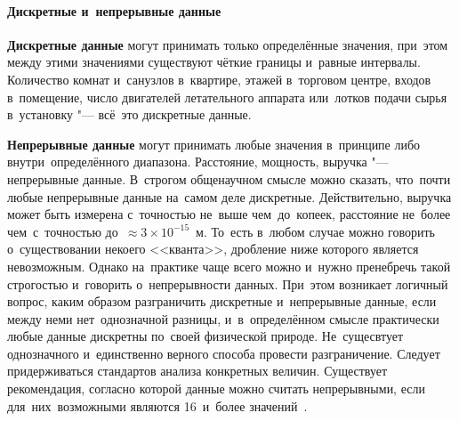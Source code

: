 \documentclass[]{scrartcl}
\begin{document}
\paragraph{Дискретные и~непрерывные данные}\label{Discret-data}
\par
\textbf{Дискретные данные} могут принимать только определённые значения, при~этом между этими значениями существуют чёткие границы и~равные интервалы. Количество комнат и~санузлов в~квартире, этажей в~торговом центре, входов в~помещение, число двигателей летательного аппарата или~лотков подачи сырья в~установку "--- всё~это дискретные данные.
\par
\textbf{Непрерывные данные} могут принимать любые значения в~принципе либо внутри~определённого диапазона. Расстояние, мощность, выручка "--- непрерывные данные. В~строгом общенаучном смысле можно сказать, что~почти любые непрерывные данные на~самом деле дискретные. Действительно, выручка может быть измерена с~точностью не~выше чем~до~копеек, расстояние не~более чем~с~точностью до~$\approx3\times10^{-15}$~м. То~есть в~любом случае можно говорить о~существовании некоего <<кванта>>, дробление ниже которого является невозможным. Однако на~практике чаще всего можно и~нужно пренебречь такой строгостью и~говорить о~непрерывности данных. При~этом возникает логичный вопрос, каким образом разграничить дискретные и~непрерывные данные, если между неми нет~однозначной разницы, и~в~определённом смысле практически любые данные дискретны по~своей физической природе. Не~сущесвтует однозначного и~единственно верного способа провести разграничение. Следует придерживаться стандартов анализа конкретных величин. Существует рекомендация, согласно которой данные можно считать непрерывными, если для~них~возможными являются 16~и~более значений~\cite{Statistika-dlya-vsex}. 
\end{document}
